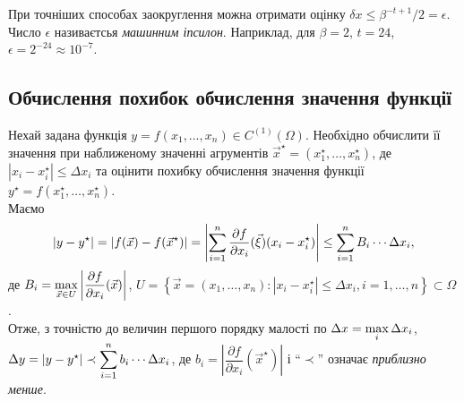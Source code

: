 При точніших способах заокруглення можна отримати оцінку $\delta x\le \beta^{-t+1}/2=\epsilon$. Число $\epsilon$ називаєтсья \textit{машинним іпсилон}. Наприклад, для $\beta=2$, $t=24$, $\epsilon=2^{-24}\approx 10^{-7}$. 

\subsection{Обчислення похибок обчислення значення функції}

Нехай задана функція $y=f(x_1,\ldots,x_n)\in C^{(1)}(\Omega)$. Необхідно обчислити її значення при наближеному значенні агрументів $\vec x^\star = \left(x_1^\star,\ldots,x_n^\star\right)$, де $\left|x_i-x_i^\star\right|\le\Delta x_i$ та оцінити похибку обчислення значення функції $y^\star = f\left(x_1^\star,\ldots,x_n^\star\right)$.\\

 Маємо \[\left|y-y^\star\right|=\left|f(\vec x)-f(\vec x^\star)\right|=\left|\displaystyle\sum\limits_{i=1}^n \dfrac{\partial f}{\partial x_i}(\vec \xi)(x_i-x_i^\star)\right|\le \displaystyle\sum\limits_{i=1}^n B_i\cdots \Delta x_i,\] де $B_i=\displaystyle\max\limits_{\vec x\in U} \left|\dfrac{\partial f}{\partial x_i}(\vec x)\right|$, $U=\left\{\vec x=(x_1,\ldots,x_n):\left|x_i-x_i^\star\right|\le\Delta x_i, i=1,\ldots,n\right\}\subset\Omega$.\\

 Отже, з точністю до величин першого порядку малості по $\Delta x=\displaystyle\max\limits_i \Delta x_i$, $\Delta y=|y-y^\star|\prec \displaystyle\sum\limits_{i=1}^n b_i\cdots \Delta x_i$, де $b_i=\left|\dfrac{\partial f}{\partial x_i}\left(\vec x^\star\right)\right|$ і ``$\prec$'' означає \textit{приблизно менше}.\\

